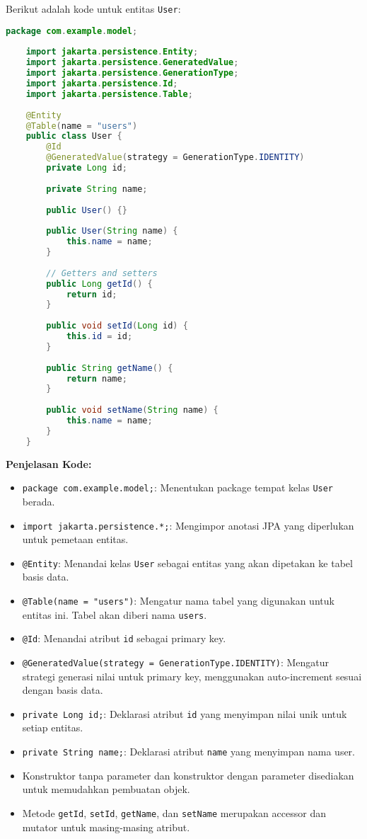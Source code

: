 Berikut adalah kode untuk entitas \texttt{User}:

\begin{lstlisting}[language=Java, style=JavaStyle]
	package com.example.model;
	
	import jakarta.persistence.Entity;
	import jakarta.persistence.GeneratedValue;
	import jakarta.persistence.GenerationType;
	import jakarta.persistence.Id;
	import jakarta.persistence.Table;
	
	@Entity
	@Table(name = "users")
	public class User {
		@Id
		@GeneratedValue(strategy = GenerationType.IDENTITY)
		private Long id;
		
		private String name;
		
		public User() {}
		
		public User(String name) {
			this.name = name;
		}
		
		// Getters and setters
		public Long getId() {
			return id;
		}
		
		public void setId(Long id) {
			this.id = id;
		}
		
		public String getName() {
			return name;
		}
		
		public void setName(String name) {
			this.name = name;
		}
	}
\end{lstlisting}

\textbf{Penjelasan Kode:}
\begin{itemize}
	\item \texttt{package com.example.model;}: Menentukan package tempat kelas \texttt{User} berada.
	\item \texttt{import jakarta.persistence.*;}: Mengimpor anotasi JPA yang diperlukan untuk pemetaan entitas.
	\item \texttt{@Entity}: Menandai kelas \texttt{User} sebagai entitas yang akan dipetakan ke tabel basis data.
	\item \texttt{@Table(name = "users")}: Mengatur nama tabel yang digunakan untuk entitas ini. Tabel akan diberi nama \texttt{users}.
	\item \texttt{@Id}: Menandai atribut \texttt{id} sebagai primary key.
	\item \texttt{@GeneratedValue(strategy = GenerationType.IDENTITY)}: Mengatur strategi generasi nilai untuk primary key, menggunakan auto-increment sesuai dengan basis data.
	\item \texttt{private Long id;}: Deklarasi atribut \texttt{id} yang menyimpan nilai unik untuk setiap entitas.
	\item \texttt{private String name;}: Deklarasi atribut \texttt{name} yang menyimpan nama user.
	\item Konstruktor tanpa parameter dan konstruktor dengan parameter disediakan untuk memudahkan pembuatan objek.
	\item Metode \texttt{getId}, \texttt{setId}, \texttt{getName}, dan \texttt{setName} merupakan accessor dan mutator untuk masing-masing atribut.
\end{itemize}


